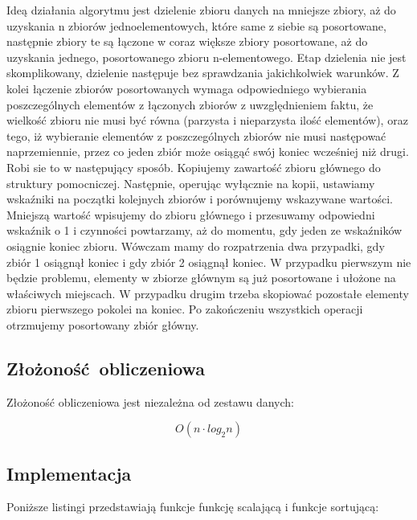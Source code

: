 \documentclass[12pt]{article}
\begin{document}
Ideą działania algorytmu jest dzielenie zbioru danych na mniejsze zbiory, aż do uzyskania n zbiorów jednoelementowych, które same
z siebie są posortowane, następnie zbiory te są łączone w coraz większe zbiory posortowane, aż do
uzyskania jednego, posortowanego zbioru n-elementowego. Etap dzielenia nie jest skomplikowany,
dzielenie następuje bez sprawdzania jakichkolwiek warunków. Z kolei łączenie zbiorów
posortowanych wymaga odpowiedniego wybierania poszczególnych elementów z łączonych zbiorów z
uwzględnieniem faktu, że wielkość zbioru nie musi być równa (parzysta i nieparzysta ilość elementów),
oraz tego, iż wybieranie elementów z poszczególnych zbiorów nie musi następować naprzemiennie,
przez co jeden zbiór może osiągąć swój koniec wcześniej niż drugi. Robi sie to w następujący sposób.
Kopiujemy zawartość zbioru głównego do struktury pomocniczej. Następnie, operując wyłącznie
na kopii, ustawiamy wskaźniki na początki kolejnych zbiorów i porównujemy wskazywane wartości.
Mniejszą wartość wpisujemy do zbioru głównego i przesuwamy odpowiedni wskaźnik o 1 i czynności
powtarzamy, aż do momentu, gdy jeden ze wskaźników osiągnie koniec zbioru. Wówczam mamy do
rozpatrzenia dwa przypadki, gdy zbiór 1 osiągnął koniec i gdy zbiór 2 osiągnął koniec. W przypadku
pierwszym nie będzie problemu, elementy w zbiorze głównym są już posortowane i ułożone na właściwych miejscach. W przypadku drugim trzeba skopiować pozostałe elementy zbioru pierwszego
pokolei na koniec. Po zakończeniu wszystkich operacji otrzmujemy posortowany zbiór główny.
\newpage
\subsection{Złożoność obliczeniowa}
Złożoność obliczeniowa jest niezależna od zestawu danych:

{ \Large \begin{equation*}
       O(n \cdot log_2 n)  
\end{equation*}}
\subsection{Implementacja}
Poniższe listingi przedstawiają funkcje funkcję scalającą i funkcje sortującą:
\end{document}
